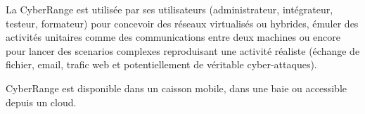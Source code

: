 La CyberRange est utilisée par ses utilisateurs (administrateur, intégrateur, testeur, formateur) pour concevoir des réseaux virtualisés ou hybrides, émuler des activités unitaires comme des communications entre deux machines ou encore pour lancer des scenarios complexes reproduisant une activité réaliste (échange de fichier, email, trafic web et potentiellement de véritable cyber-attaques).

CyberRange est disponible dans un caisson mobile, dans une baie ou accessible depuis un cloud.